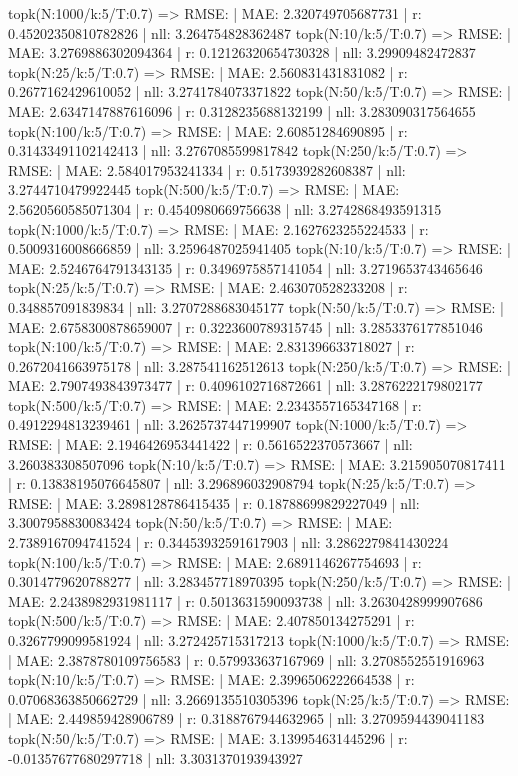 topk(N:1000/k:5/T:0.7) => RMSE: | MAE: 2.320749705687731 | r: 0.45202350810782826 | nll: 3.264754828362487
topk(N:10/k:5/T:0.7) => RMSE: | MAE: 3.2769886302094364 | r: 0.12126320654730328 | nll: 3.29909482472837
topk(N:25/k:5/T:0.7) => RMSE: | MAE: 2.560831431831082 | r: 0.2677162429610052 | nll: 3.2741784073371822
topk(N:50/k:5/T:0.7) => RMSE: | MAE: 2.6347147887616096 | r: 0.3128235688132199 | nll: 3.283090317564655
topk(N:100/k:5/T:0.7) => RMSE: | MAE: 2.60851284690895 | r: 0.31433491102142413 | nll: 3.2767085599817842
topk(N:250/k:5/T:0.7) => RMSE: | MAE: 2.584017953241334 | r: 0.5173939282608387 | nll: 3.2744710479922445
topk(N:500/k:5/T:0.7) => RMSE: | MAE: 2.5620560585071304 | r: 0.4540980669756638 | nll: 3.2742868493591315
topk(N:1000/k:5/T:0.7) => RMSE: | MAE: 2.1627623255224533 | r: 0.5009316008666859 | nll: 3.2596487025941405
topk(N:10/k:5/T:0.7) => RMSE: | MAE: 2.5246764791343135 | r: 0.3496975857141054 | nll: 3.2719653743465646
topk(N:25/k:5/T:0.7) => RMSE: | MAE: 2.463070528233208 | r: 0.348857091839834 | nll: 3.2707288683045177
topk(N:50/k:5/T:0.7) => RMSE: | MAE: 2.6758300878659007 | r: 0.3223600789315745 | nll: 3.2853376177851046
topk(N:100/k:5/T:0.7) => RMSE: | MAE: 2.831396633718027 | r: 0.2672041663975178 | nll: 3.287541162512613
topk(N:250/k:5/T:0.7) => RMSE: | MAE: 2.7907493843973477 | r: 0.4096102716872661 | nll: 3.2876222179802177
topk(N:500/k:5/T:0.7) => RMSE: | MAE: 2.2343557165347168 | r: 0.4912294813239461 | nll: 3.2625737447199907
topk(N:1000/k:5/T:0.7) => RMSE: | MAE: 2.1946426953441422 | r: 0.5616522370573667 | nll: 3.260383308507096
topk(N:10/k:5/T:0.7) => RMSE: | MAE: 3.215905070817411 | r: 0.13838195076645807 | nll: 3.296896032908794
topk(N:25/k:5/T:0.7) => RMSE: | MAE: 3.2898128786415435 | r: 0.18788699829227049 | nll: 3.3007958830083424
topk(N:50/k:5/T:0.7) => RMSE: | MAE: 2.7389167094741524 | r: 0.34453932591617903 | nll: 3.2862279841430224
topk(N:100/k:5/T:0.7) => RMSE: | MAE: 2.6891146267754693 | r: 0.3014779620788277 | nll: 3.283457718970395
topk(N:250/k:5/T:0.7) => RMSE: | MAE: 2.2438982931981117 | r: 0.5013631590093738 | nll: 3.2630428999907686
topk(N:500/k:5/T:0.7) => RMSE: | MAE: 2.407850134275291 | r: 0.3267799099581924 | nll: 3.272425715317213
topk(N:1000/k:5/T:0.7) => RMSE: | MAE: 2.3878780109756583 | r: 0.579933637167969 | nll: 3.2708552551916963
topk(N:10/k:5/T:0.7) => RMSE: | MAE: 2.3996506222664538 | r: 0.07068363850662729 | nll: 3.2669135510305396
topk(N:25/k:5/T:0.7) => RMSE: | MAE: 2.449859428906789 | r: 0.3188767944632965 | nll: 3.2709594439041183
topk(N:50/k:5/T:0.7) => RMSE: | MAE: 3.139954631445296 | r: -0.01357677680297718 | nll: 3.3031370193943927

